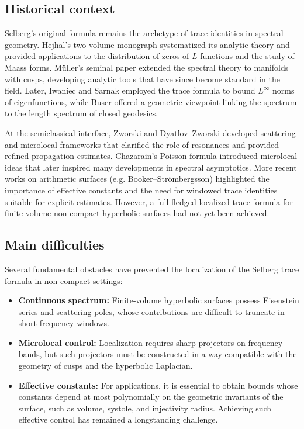 \subsection{Historical context}

Selberg's original formula \cite{selberg1956} remains the archetype of trace identities in spectral geometry. 
Hejhal's two-volume monograph \cite{hejhal1976,hejhal1983} systematized its analytic theory and provided applications to the distribution of zeros of $L$-functions and the study of Maass forms. 
M\"uller's seminal paper \cite{mueller1983} extended the spectral theory to manifolds with cusps, developing analytic tools that have since become standard in the field. 
Later, Iwaniec and Sarnak \cite{iwaniec1995} employed the trace formula to bound $L^\infty$ norms of eigenfunctions, while Buser \cite{buser1992} offered a geometric viewpoint linking the spectrum to the length spectrum of closed geodesics.

At the semiclassical interface, Zworski \cite{zworski2012} and Dyatlov--Zworski \cite{dyatlovzworski2019} developed scattering and microlocal frameworks that clarified the role of resonances and provided refined propagation estimates. 
Chazarain's Poisson formula \cite{chazarain1974} introduced microlocal ideas that later inspired many developments in spectral asymptotics. 
More recent works on arithmetic surfaces (e.g. Booker--Str\"ombergsson) highlighted the importance of effective constants and the need for windowed trace identities suitable for explicit estimates. 
However, a full-fledged localized trace formula for finite-volume non-compact hyperbolic surfaces had not yet been achieved.

\subsection{Main difficulties}

Several fundamental obstacles have prevented the localization of the Selberg trace formula in non-compact settings:

\begin{itemize}
  \item \textbf{Continuous spectrum:} Finite-volume hyperbolic surfaces possess Eisenstein series and scattering poles, whose contributions are difficult to truncate in short frequency windows.
  \item \textbf{Microlocal control:} Localization requires sharp projectors on frequency bands, but such projectors must be constructed in a way compatible with the geometry of cusps and the hyperbolic Laplacian.
  \item \textbf{Effective constants:} For applications, it is essential to obtain bounds whose constants depend at most polynomially on the geometric invariants of the surface, such as volume, systole, and injectivity radius. Achieving such effective control has remained a longstanding challenge.
\end{itemize}

